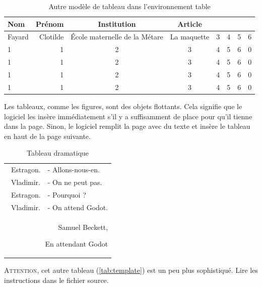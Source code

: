 \documentclass[10pt]{article}
\begin{document}
\begin{table}[ht]
\begin{center}
\begin{tabular}{|l||r| c| c| c| c|| c c|}
 \hline
 Nom &  Prénom & Institution & Article &  & &  &  \\ \hline \hline
   Fayard & Clotilde & École maternelle de la Métare& La maquette & 3 & 4& 5 & 6 \\ \hline
   1 &1& 2 & 3 & 4& 5& 6 &  0 \\ \hline
   1 &1& 2 & 3 & 4& 5& 6 &  0 \\ \hline
   1 &1& 2 & 3 & 4& 5& 6 &  0 \\ \hline
   1 &1& 2 & 3 & 4& 5& 6 &  0 \\ \hline

\end{tabular}
\end{center}
\caption{ \label{Tableau2} {Autre modèle de tableau dans l'environnement table} }
\end{table}

Les tableaux, comme les figures, sont des objets flottants. Cela
signifie que le logiciel les insère immédiatement s'il y a suffisamment
de place pour qu'il tienne dans la page. Sinon, le logiciel remplit la
page avec du texte et insère le tableau en haut de la page suivante.

\begin{table}[ht]
\begin{flushright}
\begin{tabular}{ll}\
Estragon.   & -  Allons-nous-en. \\
~Vladimir.   & -  On ne peut pas. \\
~Estragon.   & -  Pourquoi ? \\
~Vladimir. & -  On attend Godot. \\
 \multicolumn{2}{r}{~~~~~~Samuel Beckett, \begin{itshape} En attendant Godot \end{itshape}} \\
 \end{tabular}
 \end{flushright}
\caption{ \label{Tableau3} {Tableau dramatique} }
\end{table}

\textsc{Attention}, cet autre tableau (\ref{tab:template}) est un peu
plus sophistiqué. Lire les instructions dans le fichier source. \bigskip
\end{document}

